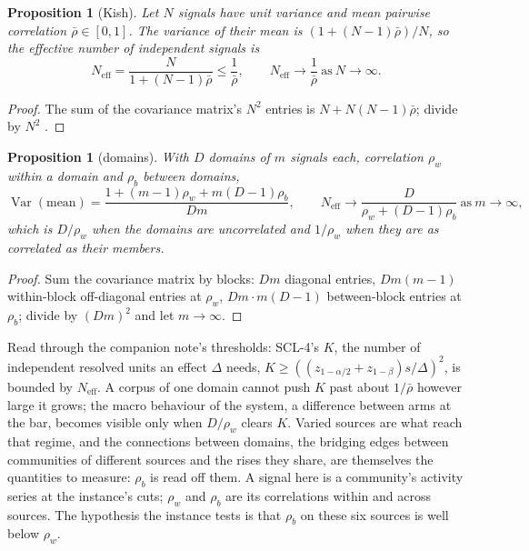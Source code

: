 \documentclass[11pt]{article}
\theoremstyle{plain}
\newtheorem{proposition}[theorem]{Proposition}
\theoremstyle{definition}
\theoremstyle{remark}
\newcommand{\Neff}{N_{\mathrm{eff}}}
\DeclareMathOperator{\Var}{Var}
\begin{document}
\begin{proposition}[Kish]\label{prop:kish}
Let $N$ signals have unit variance and mean pairwise correlation $\bar\rho\in[0,1]$. The variance of
their mean is $(1+(N-1)\bar\rho)/N$, so the effective number of independent signals is
\[
  \Neff = \frac{N}{1+(N-1)\bar\rho}\le\frac1{\bar\rho},\qquad \Neff\to\frac1{\bar\rho}\ \text{as}\ N\to\infty.
\]
\end{proposition}
\begin{proof}
The sum of the covariance matrix's $N^2$ entries is $N + N(N-1)\bar\rho$; divide by $N^2$
\citep{kish1965}.
\end{proof}

\begin{proposition}[domains]\label{prop:domains}
With $D$ domains of $m$ signals each, correlation $\rho_w$ within a domain and $\rho_b$ between
domains,
\[
  \Var(\text{mean}) = \frac{1+(m-1)\rho_w + m(D-1)\rho_b}{Dm},\qquad
  \Neff \to \frac{D}{\rho_w + (D-1)\rho_b}\ \text{as}\ m\to\infty,
\]
which is $D/\rho_w$ when the domains are uncorrelated and $1/\rho_w$ when they are as correlated as
their members.
\end{proposition}
\begin{proof}
Sum the covariance matrix by blocks: $Dm$ diagonal entries, $Dm(m-1)$ within-block off-diagonal
entries at $\rho_w$, $Dm\cdot m(D-1)$ between-block entries at $\rho_b$; divide by $(Dm)^2$ and let
$m\to\infty$.
\end{proof}

Read through the companion note's thresholds: SCL-4's $K$, the number of independent resolved
units an effect $\Delta$ needs, $K\ge((z_{1-\alpha/2}+z_{1-\beta})s/\Delta)^2$, is bounded by $\Neff$.
A corpus of one domain cannot push $K$ past about $1/\bar\rho$ however large it grows; the macro
behaviour of the system, a difference between arms at the bar, becomes visible only when $D/\rho_w$
clears $K$. Varied sources are what reach that regime, and the connections between domains, the
bridging edges between communities of different sources and the rises they share, are themselves
the quantities to measure: $\rho_b$ is read off them. A signal here is a community's activity
series at the instance's cuts; $\rho_w$ and $\rho_b$ are its correlations within and across
sources. The hypothesis the instance tests is that $\rho_b$ on these six sources is well below
$\rho_w$.
\end{document}
